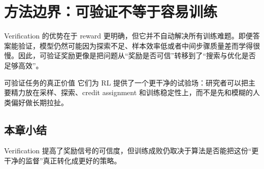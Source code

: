 \section{方法边界：可验证不等于容易训练}
Verification 的优势在于 reward 更明确，但它并不自动解决所有训练难题。即便答案能验证，模型仍然可能因为探索不足、样本效率低或者中间步骤质量差而学得很慢。因此，可验证奖励更像是把问题从“奖励是否可信”转移到了“搜索与优化是否足够高效”。

\begin{importantbox}{可验证任务的真正价值}
它们为 RL 提供了一个更干净的试验场：研究者可以把主要精力放在采样、探索、credit assignment 和训练稳定性上，而不是先和模糊的人类偏好做长期拉扯。
\end{importantbox}

\subsection{本章小结}
Verification 提高了奖励信号的可信度，但训练成败仍取决于算法是否能把这份“更干净的监督”真正转化成更好的策略。

\newpage
